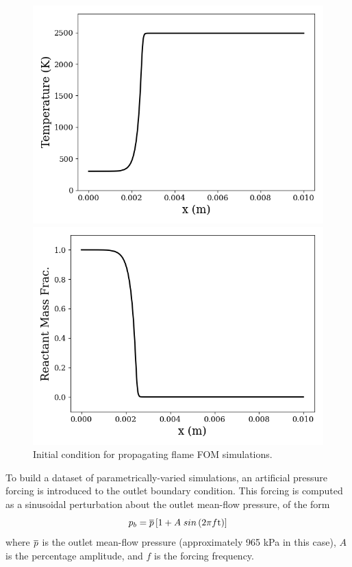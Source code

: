 \begin{figure}
	\begin{minipage}{0.49\linewidth}
		\includegraphics[width=0.99\linewidth]{Chapters/TransientFlame/Images/init_cond_temp.png}
	\end{minipage}
	\begin{minipage}{0.49\linewidth}
		\includegraphics[width=0.99\linewidth]{Chapters/TransientFlame/Images/init_cond_mf.png}
	\end{minipage}
	\caption{\label{fig:flameIC}Initial condition for propagating flame FOM simulations.}
\end{figure}

To build a dataset of parametrically-varied simulations, an artificial pressure forcing is introduced to the outlet boundary condition. This forcing is computed as a sinusoidal perturbation about the outlet mean-flow pressure, of the form
%
\begin{equation}
	p_b = \overline{p} \left[1 + A \; sin\left(2 \pi f \text{t}\right)\right]
\end{equation}
%
where $\overline{p}$ is the outlet mean-flow pressure (approximately 965 kPa in this case), $A$ is the percentage amplitude, and $f$ is the forcing frequency.